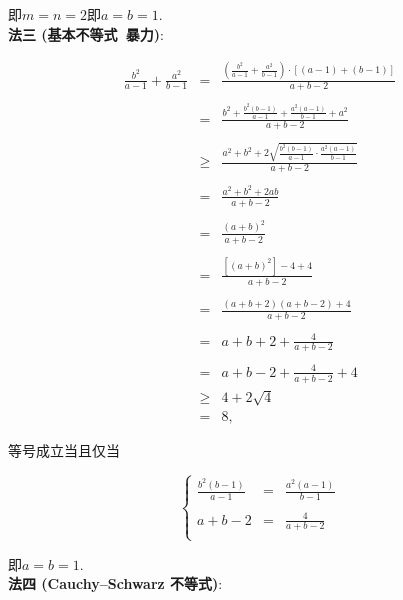 \documentclass[8pt]{article}
\begin{document}
\begin{enumerate}[label=(\arabic*)]
				即$m=n=2$即$a=b=1$.
			~\\

			\textbf{法三 (基本不等式\ 暴力)}:

				$$
				\begin{array}{rcl}
					\displaystyle \frac{b^2}{a-1} + \frac{a^2}{b-1}&=&\displaystyle \frac{\left(\frac{b^2}{a-1} + \frac{a^2}{b-1}\right)\cdot\left[(a-1)+(b-1)\right]}{a+b-2}\\\\
					&=&\displaystyle \frac{b^2+\frac{b^2(b-1)}{a-1}+\frac{a^2(a-1)}{b-1}+a^2}{a+b-2}\\\\
					&\geq&\displaystyle \frac{a^2+b^2+2\sqrt{\frac{b^2(b-1)}{a-1}\cdot \frac{a^2(a-1)}{b-1}}}{a+b-2}\\\\
					&=&\displaystyle \frac{a^2+b^2+2ab}{a+b-2}\\\\
					&=&\displaystyle \frac{(a+b)^2}{a+b-2}\\\\
					&=&\displaystyle \frac{[(a+b)^2]-4+4}{a+b-2}\\\\
					&=&\displaystyle \frac{(a+b+2)(a+b-2)+4}{a+b-2}\\\\
					&=&\displaystyle a+b+2+\frac{4}{a+b-2}\\\\
					&=&\displaystyle a+b-2+\frac{4}{a+b-2} + 4\\
					&\geq&\displaystyle 4+2\sqrt{4}\\
					&=&8,
				\end{array}
				$$

				等号成立当且仅当

				$$
				\left\{
				\begin{array}{rcl}
					\displaystyle \frac{b^2(b-1)}{a-1}&=&\displaystyle \frac{a^2(a-1)}{b-1}\\\\
					a+b-2&=&\displaystyle \frac{4}{a+b-2}\\
				\end{array}
				\right.
				$$

				即$a=b=1$.
			~\\

			\textbf{法四 (Cauchy–Schwarz 不等式)}: 


\end{enumerate}
\end{document}

